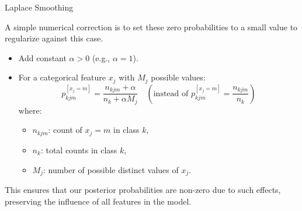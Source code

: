 \documentclass[11pt,compress,t,notes=noshow, xcolor=table]{beamer}
\begin{document}
\begin{vbframe}{Laplace Smoothing}

A simple numerical correction is to set these zero probabilities to a small value to regularize against this case.

\lz
 
\begin{itemize}
\item Add constant $\alpha > 0$ (e.g., $\alpha = 1$).
\item For a categorical feature $x_j$ with $M_j$ possible values:
  $$
  p_{kjm}^{[x_j = m]} = \frac{n_{kjm} + \alpha}{n_{k} + \alpha M_j} \quad \left(\text{instead of }  p_{kjm}^{[x_j = m]} = \frac{n_{kjm}}{n_{k}} \right)
  $$
  where:
  \begin{itemize}
    \item $n_{kjm}$: count of $x_j = m$ in class $k$,
    \item $n_{k}$: total counts in class $k$,
    \item $M_j$: number of possible distinct values of $x_j$.
  \end{itemize}
\end{itemize}

\lz

This ensures that our posterior probabilities are non-zero due to such effects, preserving the influence of all features in the model.

\end{vbframe}







\end{document}
